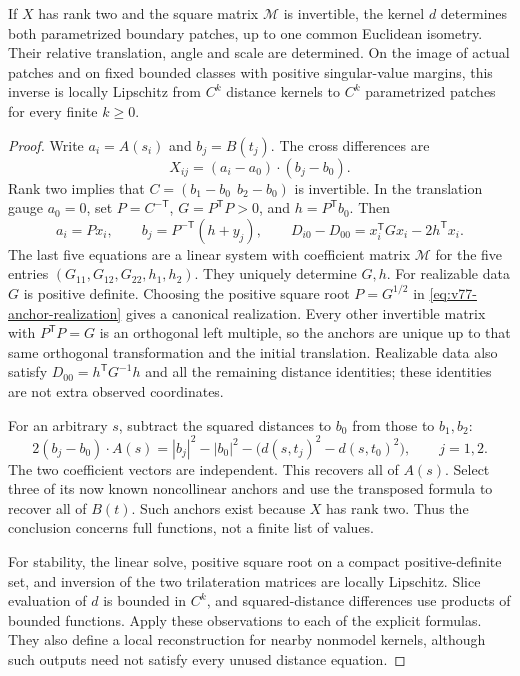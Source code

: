 \begin{proposition}
\label{prop:v77-distance}
If $X$ has rank two and the square matrix $\mathcal M$ is invertible,
the kernel $d$ determines both parametrized boundary patches, up to one
common Euclidean isometry.  Their relative translation, angle and scale
are determined.  On the image of actual patches and on fixed bounded
classes with positive singular-value margins, this inverse is locally
Lipschitz from $C^k$ distance kernels to $C^k$ parametrized patches for
every finite $k\ge0$.
\end{proposition}
\begin{proof}
Write $a_i=A(s_i)$ and $b_j=B(t_j)$.  The cross differences are
\[
 X_{ij}=(a_i-a_0)\cdot(b_j-b_0).
\]
Rank two implies that $C=(b_1-b_0\ \ b_2-b_0)$ is invertible.  In
the translation gauge $a_0=0$, set $P=C^{-\mathsf T}$,
$G=P^\mathsf TP>0$, and $h=P^\mathsf Tb_0$.  Then
\begin{equation}\label{eq:v77-anchor-realization}
 a_i=Px_i,\qquad b_j=P^{-\mathsf T}(h+y_j),\qquad
 D_{i0}-D_{00}=x_i^\mathsf TGx_i-2h^\mathsf Tx_i.
\end{equation}
The last five equations are a linear system with coefficient matrix
$\mathcal M$ for the five entries
$(G_{11},G_{12},G_{22},h_1,h_2)$.  They uniquely determine $G,h$.
For realizable data $G$ is positive definite.  Choosing the positive
square root $P=G^{1/2}$ in \eqref{eq:v77-anchor-realization} gives a
canonical realization.  Every other invertible matrix with
$P^\mathsf TP=G$ is an orthogonal left multiple, so the anchors are
unique up to that same orthogonal transformation and the initial
translation.  Realizable data also satisfy
$D_{00}=h^\mathsf TG^{-1}h$ and all the remaining distance identities;
these identities are not extra observed coordinates.

For an arbitrary $s$, subtract the squared distances to $b_0$ from
those to $b_1,b_2$:
\begin{equation}\label{eq:v77-trilateration}
 2(b_j-b_0)\cdot A(s)
 =|b_j|^2-|b_0|^2-\bigl(d(s,t_j)^2-d(s,t_0)^2\bigr),
 \qquad j=1,2.
\end{equation}
The two coefficient vectors are independent.  This recovers all of
$A(s)$.  Select three of its now known noncollinear anchors and use
the transposed formula to recover all of $B(t)$.  Such anchors exist
because $X$ has rank two.  Thus the conclusion concerns full functions,
not a finite list of values.

For stability, the linear solve, positive square root on a compact
positive-definite set, and inversion of the two trilateration matrices
are locally Lipschitz.  Slice evaluation of $d$ is bounded in $C^k$,
and squared-distance differences use products of bounded functions.
Apply these observations to each of the explicit formulas.  They also
define a local reconstruction for nearby nonmodel kernels, although such
outputs need not satisfy every unused distance equation.
\end{proof}

